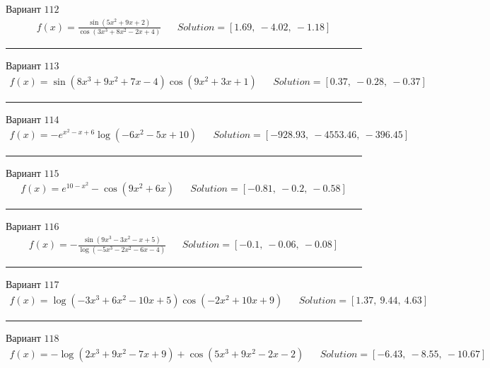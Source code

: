 \documentclass[11pt]{report}
\begin{document}
Вариант \(112\)
\begin{align*}
    f(x) = \frac{\sin{\left(5 x^{2} + 9 x + 2 \right)}}{\cos{\left(3 x^{3} + 8 x^{2} - 2 x + 4 \right)}} && Solution = \left[ 1.69, \  -4.02, \  -1.18\right]
\end{align*}
\begin{center}
    \noindent\rule{8cm}{0.4pt}
\end{center}
Вариант \(113\)
\begin{align*}
    f(x) = \sin{\left(8 x^{3} + 9 x^{2} + 7 x - 4 \right)} \cos{\left(9 x^{2} + 3 x + 1 \right)} && Solution = \left[ 0.37, \  -0.28, \  -0.37\right]
\end{align*}
\begin{center}
    \noindent\rule{8cm}{0.4pt}
\end{center}
Вариант \(114\)
\begin{align*}
    f(x) = - e^{x^{2} - x + 6} \log{\left(- 6 x^{2} - 5 x + 10 \right)} && Solution = \left[ -928.93, \  -4553.46, \  -396.45\right]
\end{align*}
\begin{center}
    \noindent\rule{8cm}{0.4pt}
\end{center}
Вариант \(115\)
\begin{align*}
    f(x) = e^{10 - x^{2}} - \cos{\left(9 x^{2} + 6 x \right)} && Solution = \left[ -0.81, \  -0.2, \  -0.58\right]
\end{align*}
\begin{center}
    \noindent\rule{8cm}{0.4pt}
\end{center}
Вариант \(116\)
\begin{align*}
    f(x) = - \frac{\sin{\left(9 x^{3} - 3 x^{2} - x + 5 \right)}}{\log{\left(- 5 x^{3} - 2 x^{2} - 6 x - 4 \right)}} && Solution = \left[ -0.1, \  -0.06, \  -0.08\right]
\end{align*}
\begin{center}
    \noindent\rule{8cm}{0.4pt}
\end{center}
Вариант \(117\)
\begin{align*}
    f(x) = \log{\left(- 3 x^{3} + 6 x^{2} - 10 x + 5 \right)} \cos{\left(- 2 x^{2} + 10 x + 9 \right)} && Solution = \left[ 1.37, \  9.44, \  4.63\right]
\end{align*}
\begin{center}
    \noindent\rule{8cm}{0.4pt}
\end{center}
Вариант \(118\)
\begin{align*}
    f(x) = - \log{\left(2 x^{3} + 9 x^{2} - 7 x + 9 \right)} + \cos{\left(5 x^{3} + 9 x^{2} - 2 x - 2 \right)} && Solution = \left[ -6.43, \  -8.55, \  -10.67\right]
\end{align*}
\end{document}
